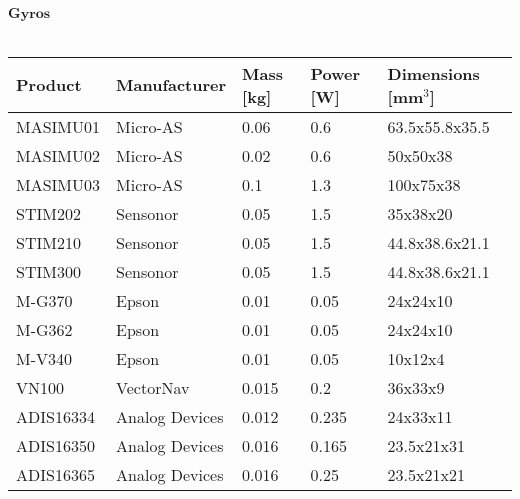 		      $\textbf{Gyros}$\\ \\
		      \begin{tabular}{p{3cm}p{3cm}p{2cm}p{2cm}p{2cm}} \toprule
		      	Product & Manufacturer & Mass [kg] & Power [W]& Dimensions [mm$^{3}$]\\ \midrule
		      	
		      	MASIMU01 & Micro-AS & 0.06 & 0.6 & 63.5x55.8x35.5 \\
		      	
		      	MASIMU02 & Micro-AS & 0.02 & 0.6 & 50x50x38\\
		      	
		      	MASIMU03 & Micro-AS & 0.1 & 1.3 &  100x75x38\\
		      	
		      	STIM202 & Sensonor & 0.05 & 1.5 & 35x38x20\\
		      	
		      	STIM210 & Sensonor & 0.05 & 1.5 & 44.8x38.6x21.1\\
		      	
		      	STIM300 & Sensonor & 0.05 & 1.5 & 44.8x38.6x21.1\\
		      	
		      	M-G370 & Epson & 0.01 & 0.05 & 24x24x10\\
		      	
		      	M-G362 & Epson & 0.01 & 0.05 & 24x24x10\\
		      	
		      	M-V340 & Epson & 0.01 & 0.05 & 10x12x4\\
		      	
		      	VN100 & VectorNav & 0.015 & 0.2 & 36x33x9\\
		      	
		      	ADIS16334 & Analog Devices & 0.012 & 0.235 & 24x33x11\\
		      	
		      	ADIS16350 &  Analog Devices & 0.016 & 0.165 & 23.5x21x31\\
		      	
		      	ADIS16365 & Analog Devices & 0.016 & 0.25 & 23.5x21x21\\
		      	
		      	 \bottomrule
		      \end{tabular}\\ \\ \\ \\
		      
